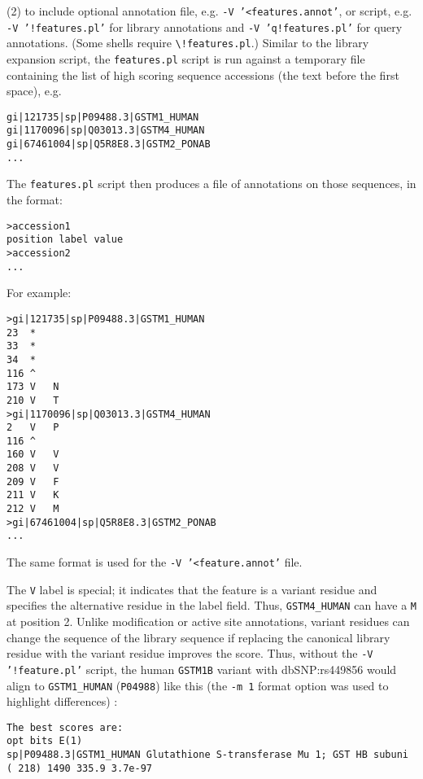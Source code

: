 \documentclass[11pt]{article}
\begin{document}
\begin{description}
(2) to include optional annotation file, e.g. \texttt{-V
  '<features.annot'}, or script, e.g. \texttt{-V '!features.pl'} for
library annotations and \texttt{-V 'q!features.pl'} for query annotations. (Some shells require \texttt{\textbackslash!features.pl}.) Similar to the library expansion script, the
\texttt{features.pl} script is run against a temporary file containing
the list of high scoring sequence accessions (the text before the
first space), e.g.
\begin{footnotesize}
\begin{verbatim}
gi|121735|sp|P09488.3|GSTM1_HUMAN
gi|1170096|sp|Q03013.3|GSTM4_HUMAN
gi|67461004|sp|Q5R8E8.3|GSTM2_PONAB
...
\end{verbatim}
\end{footnotesize}
The \texttt{features.pl} script then produces a file of annotations on
those sequences, in the format:
\begin{verbatim}
>accession1
position label value
>accession2
...
\end{verbatim}
For example:
\begin{footnotesize}
\begin{verbatim}
>gi|121735|sp|P09488.3|GSTM1_HUMAN
23	*	
33	*	
34	*	
116	^	
173	V	N
210	V	T
>gi|1170096|sp|Q03013.3|GSTM4_HUMAN
2	V	P
116	^	
160	V	V
208	V	V
209	V	F
211	V	K
212	V	M
>gi|67461004|sp|Q5R8E8.3|GSTM2_PONAB
...
\end{verbatim}
\end{footnotesize}
The same format is used for the \texttt{-V '<feature.annot'} file.

The \texttt{V} label is special; it indicates that the feature is a
variant residue and specifies the alternative residue in the label
field.  Thus, \texttt{GSTM4\_HUMAN} can have a \texttt{M} at position
2.  Unlike modification or active site annotations, variant residues
can change the sequence of the library sequence if replacing the
canonical library residue with the variant residue improves the score.
Thus, without the \texttt{-V '!feature.pl'} script, the human
\texttt{GSTM1B} variant with dbSNP:rs449856 would align to
\texttt{GSTM1\_HUMAN} (\texttt{P04988}) like this (the \texttt{-m 1}
format option was used to highlight differences) :
\begin{footnotesize}
\begin{verbatim}
The best scores are:                                                          opt bits E(1)
sp|P09488.3|GSTM1_HUMAN Glutathione S-transferase Mu 1; GST HB subuni  ( 218) 1490 335.9 3.7e-97


\end{verbatim}
\end{footnotesize}
\end{description}
\end{document}
